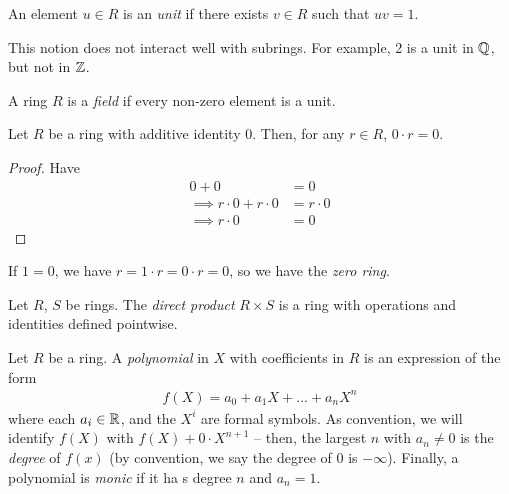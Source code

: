\documentclass{../../template/note}
\begin{document}
    \begin{definition}[Units]
        An element $u \in R$ is an \emph{unit} if there exists $v \in R$ such that $uv = 1$.
    \end{definition}
    
    \begin{remark*}
        This notion does not interact well with subrings. For example, 2 is a unit in $\mathbb Q$, but not in $\mathbb Z$.
    \end{remark*}
    
    \begin{definition}[Field]
        A ring $R$ is a \emph{field} if every non-zero element is a unit.
    \end{definition}
    
    \begin{proposition} 
        Let $R$ be a ring with additive identity $0$. Then, for any $r \in R$, $0 \cdot r = 0$.
    \end{proposition}
    
    \begin{proof}
        Have
        \begin{align*}
            0 + 0 &= 0 \\
            \implies r \cdot 0 + r \cdot 0 &= r \cdot 0 \\
            \implies r \cdot 0 &= 0
        \end{align*}
    \end{proof}
    
    \begin{remark*}
        If $1 = 0$, we have $r = 1 \cdot r = 0 \cdot r = 0$, so we have the \emph{zero ring}.
    \end{remark*}

    \begin{definition}
        Let $R$, $S$ be rings. The \emph{direct product} $R \times S$ is a ring with operations and identities defined pointwise.
    \end{definition}
    
    \begin{definition}[Polynomials]
        Let $R$ be a ring. A \emph{polynomial} in $X$ with coefficients in $R$ is an expression of the form
        \begin{align*}
            f(X) = a_0 + a_1X + \dots + a_nX^n
        \end{align*}
        where each $a_i \in \mathbb R$, and the $X^i$ are formal symbols.  As convention, we will identify $f(X)$ with $f(X) + 0 \cdot X^{n+1}$ -- then, the largest $n$ with $a_n \neq 0$ is the \emph{degree} of $f(x)$ (by convention, we say the degree of $0$ is $-\infty$). Finally, a polynomial is \emph{monic} if it ha s degree $n$ and $a_n=1$.
    \end{definition}
    
\end{document}
